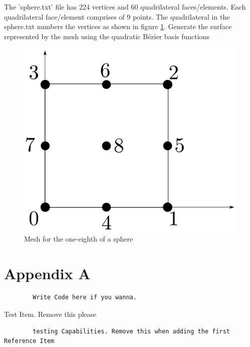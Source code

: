\documentclass[a4paper, 11pt]{article}
\begin{document}
\begin{enumerate}
The 'sphere.txt' file has 224 vertices and 60 quadrilateral faces/elements. Each quadrilateral face/element comprises of 9 points. The quadrilateral in the sphere.txt numbers the vertices as shown in figure \ref{fig:sphereNodeNumber}. Generate the surface represented by the mesh  using the quadratic B\'{e}zier basis functions
\begin{figure}
\includegraphics[scale=0.35]{resources/quadraticSquareElement.pdf} 
\centering
\caption{Mesh for the one-eighth of a sphere}
\label{fig:sphereNodeNumber} 
\end{figure}

\newpage

\section{Appendix A}
	
	\begin{verbatim}
	    Write Code here if you wanna.
	\end{verbatim}

\newpage

\begin{thebibliography}{9}
	 Test Item. Remove this please 
		
	\begin{verbatim}
	    testing Capabilities. Remove this when adding the first Reference Item
	\end{verbatim}

\end{thebibliography}


\end{enumerate}
\end{document}
